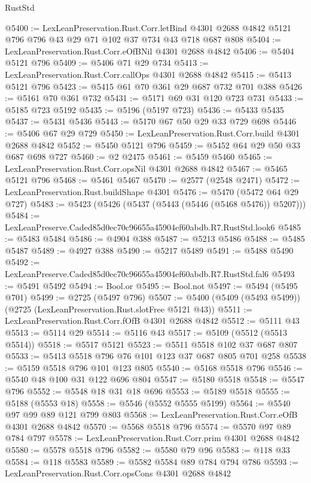 \begin{lexlean}{RustStd}
\begin{coremodule}
@5400 := LexLeanPreservation.Rust.Corr.letBind
    @4301
    @2688
    @4842
    @5121
    @796
    @796
    @43
    @29
    @71
    @102
    @37
    @734
    @43
    @718
    @687
    @808
@5404 := LexLeanPreservation.Rust.Corr.eOfBNil @4301 @2688 @4842
@5406 := @5404 @5121 @796
@5409 := @5406 @71 @29 @734
@5413 := LexLeanPreservation.Rust.Corr.callOps @4301 @2688 @4842
@5415 := @5413 @5121 @796
@5423 := @5415 @61 @70 @361 @29 @687 @732 @701 @388
@5426 := @5161 @70 @361 @732
@5431 := @5171 @69 @31 @120 @723 @731
@5433 := @5185 @723 @5192
@5435 := @5196 (@5197 @723)
@5436 := @5433 @5435
@5437 := @5431 @5436
@5443 := @5170 @67 @50 @29 @33 @729 @698
@5446 := @5406 @67 @29 @729
@5450 := LexLeanPreservation.Rust.Corr.build @4301 @2688 @4842
@5452 := @5450 @5121 @796
@5459 := @5452 @64 @29 @50 @33 @687 @698 @727
@5460 := @2 @2475
@5461 := @5459 @5460
@5465 := LexLeanPreservation.Rust.Corr.opsNil @4301 @2688 @4842
@5467 := @5465 @5121 @796
@5468 := @5461 @5467
@5470 := @2577 (@2548 @2471)
@5472 := LexLeanPreservation.Rust.buildShape @4301
@5476 := @5470 (@5472 @64 @29 @727)
@5483 := @5423 (@5426 (@5437 (@5443 (@5446 (@5468 @5476)) @5207)))
@5484 := LexLeanPreserve.Caded85d0ec70c96655a45904ef60abdb.R7.RustStd.look6
@5485 := @5483 @5484
@5486 := @4904 @388
@5487 := @5213 @5486
@5488 := @5485 @5487
@5489 := @4927 @388
@5490 := @5217 @5489
@5491 := @5488 @5490
@5492 := LexLeanPreserve.Caded85d0ec70c96655a45904ef60abdb.R7.RustStd.fal6
@5493 := @5491 @5492
@5494 := Bool.or
@5495 := Bool.not
@5497 := @5494 (@5495 @701)
@5499 := @2725 (@5497 @796)
@5507 := @5400 (@5409 (@5493 @5499)) (@2725 (LexLeanPreservation.Rust.slotFree @5121 @43))
@5511 := LexLeanPreservation.Rust.Corr.fOfB @4301 @2688 @4842
@5512 := @5111 @43
@5513 := @5114 @29
@5514 := @5116 @43
@5517 := @5109 (@5512 (@5513 @5514))
@5518 := @5517 @5121
@5523 := @5511 @5518 @102 @37 @687 @807
@5533 := @5413 @5518 @796 @76 @101 @123 @37 @687 @805 @701 @258
@5538 := @5159 @5518 @796 @101 @123 @805
@5540 := @5168 @5518 @796
@5546 := @5540 @48 @100 @31 @122 @696 @804
@5547 := @5180 @5518
@5548 := @5547 @796
@5552 := @5548 @18 @31 @18 @696
@5553 := @5189 @5518
@5555 := @5188 (@5553 @18)
@5558 := @5546 (@5552 @5555 @5199)
@5564 := @5540 @97 @99 @89 @121 @799 @803
@5568 := LexLeanPreservation.Rust.Corr.eOfB @4301 @2688 @4842
@5570 := @5568 @5518 @796
@5574 := @5570 @97 @89 @784 @797
@5578 := LexLeanPreservation.Rust.Corr.prim @4301 @2688 @4842
@5580 := @5578 @5518 @796
@5582 := @5580 @79 @96
@5583 := @118 @33
@5584 := @118 @5583
@5589 := @5582 @5584 @89 @784 @794 @786
@5593 := LexLeanPreservation.Rust.Corr.opsCons @4301 @2688 @4842

\end{coremodule}
\end{lexlean}

